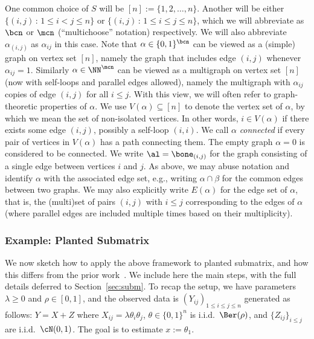 \documentclass[11pt]{article}
\begin{document}
One common choice of $S$ will be $[n] := \{1,2,\ldots,n\}$. Another will be either $\{(i,j) \,:\, 1 \le i < j \le n\}$ or $\{(i,j) \,:\, 1 \le i \le j \le n\}$, which we will abbreviate as $\bcn$ or $\mcn$ (``multichoose'' notation) respectively. We will also abbreviate $\alpha_{(i,j)}$ as $\alpha_{ij}$ in this case. Note that $\alpha \in \{0,1\}^{\bcn}$ can be viewed as a (simple) graph on vertex set $[n]$, namely the graph that includes edge $(i,j)$ whenever $\alpha_{ij} = 1$. Similarly $\alpha \in \NN^{\mcn}$ can be viewed as a multigraph on vertex set $[n]$ (now with self-loops and parallel edges allowed), namely the multigraph with $\alpha_{ij}$ copies of edge $(i,j)$ for all $i \le j$. With this view, we will often refer to graph-theoretic properties of $\alpha$. We use $V(\alpha) \subseteq [n]$ to denote the vertex set of $\alpha$, by which we mean the set of non-isolated vertices. In other words, $i \in V(\alpha)$ if there exists some edge $(i,j)$, possibly a self-loop $(i,i)$. We call $\alpha$ \emph{connected} if every pair of vertices in $V(\alpha)$ has a path connecting them. The empty graph $\alpha = 0$ is considered to be connected. We write $\al= \bone_{(i,j)}$ for the graph consisting of a single edge between vertices $i$ and $j$. As above, we may abuse notation and identify $\alpha$ with the associated edge set, e.g., writing $\alpha \cap \beta$ for the common edges between two graphs. We may also explicitly write $E(\alpha)$ for the edge set of $\alpha$, that is, the (multi)set of pairs $(i,j)$ with $i \le j$ corresponding to the edges of $\alpha$ (where parallel edges are included multiple times based on their multiplicity).




\subsubsection{Example: Planted Submatrix}
\label{sec:ex-subm}

We now sketch how to apply the above framework to planted submatrix, and how this differs from the prior work~\cite{SW-estimation}. We include here the main steps, with the full details deferred to Section~\ref{sec:subm}. To recap the setup, we have parameters $\lambda \ge 0$ and $\rho \in [0,1]$, and the observed data is $(Y_{ij})_{1 \le i \le j \le n}$ generated as follows: $Y = X + Z$ where $X_{ij} = \lambda \theta_i \theta_j$, $\theta \in \{0,1\}^n$ is i.i.d.\ $\Ber(\rho)$, and $\{Z_{ij}\}_{i \le j}$ are i.i.d.\ $\cN(0,1)$. The goal is to estimate $x := \theta_1$.
\end{document}
